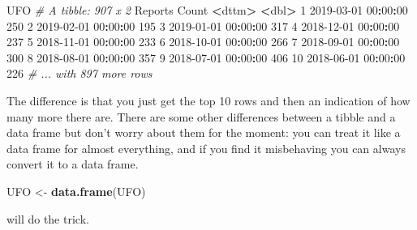 \documentclass[
]{book}
\newenvironment{Shaded}{\begin{snugshade}}{\end{snugshade}}
\newcommand{\CommentTok}[1]{\textcolor[rgb]{0.56,0.35,0.01}{\textit{#1}}}
\newcommand{\DecValTok}[1]{\textcolor[rgb]{0.00,0.00,0.81}{#1}}
\newcommand{\ErrorTok}[1]{\textcolor[rgb]{0.64,0.00,0.00}{\textbf{#1}}}
\newcommand{\KeywordTok}[1]{\textcolor[rgb]{0.13,0.29,0.53}{\textbf{#1}}}
\newcommand{\NormalTok}[1]{#1}
\newcommand{\OperatorTok}[1]{\textcolor[rgb]{0.81,0.36,0.00}{\textbf{#1}}}
\newcommand{\StringTok}[1]{\textcolor[rgb]{0.31,0.60,0.02}{#1}}
\begin{document}
\begin{Shaded}
\begin{Highlighting}[]
\NormalTok{UFO}
\CommentTok{# A tibble: 907 x 2}
\NormalTok{   Reports             Count}
   \OperatorTok{<}\NormalTok{dttm}\OperatorTok{>}\StringTok{              }\ErrorTok{<}\NormalTok{dbl}\OperatorTok{>}
\StringTok{ }\DecValTok{1} \DecValTok{2019-03-01} \DecValTok{00}\OperatorTok{:}\DecValTok{00}\OperatorTok{:}\DecValTok{00}   \DecValTok{250}
 \DecValTok{2} \DecValTok{2019-02-01} \DecValTok{00}\OperatorTok{:}\DecValTok{00}\OperatorTok{:}\DecValTok{00}   \DecValTok{195}
 \DecValTok{3} \DecValTok{2019-01-01} \DecValTok{00}\OperatorTok{:}\DecValTok{00}\OperatorTok{:}\DecValTok{00}   \DecValTok{317}
 \DecValTok{4} \DecValTok{2018-12-01} \DecValTok{00}\OperatorTok{:}\DecValTok{00}\OperatorTok{:}\DecValTok{00}   \DecValTok{237}
 \DecValTok{5} \DecValTok{2018-11-01} \DecValTok{00}\OperatorTok{:}\DecValTok{00}\OperatorTok{:}\DecValTok{00}   \DecValTok{233}
 \DecValTok{6} \DecValTok{2018-10-01} \DecValTok{00}\OperatorTok{:}\DecValTok{00}\OperatorTok{:}\DecValTok{00}   \DecValTok{266}
 \DecValTok{7} \DecValTok{2018-09-01} \DecValTok{00}\OperatorTok{:}\DecValTok{00}\OperatorTok{:}\DecValTok{00}   \DecValTok{300}
 \DecValTok{8} \DecValTok{2018-08-01} \DecValTok{00}\OperatorTok{:}\DecValTok{00}\OperatorTok{:}\DecValTok{00}   \DecValTok{357}
 \DecValTok{9} \DecValTok{2018-07-01} \DecValTok{00}\OperatorTok{:}\DecValTok{00}\OperatorTok{:}\DecValTok{00}   \DecValTok{406}
\DecValTok{10} \DecValTok{2018-06-01} \DecValTok{00}\OperatorTok{:}\DecValTok{00}\OperatorTok{:}\DecValTok{00}   \DecValTok{226}
\CommentTok{# ... with 897 more rows}
\end{Highlighting}
\end{Shaded}

The difference is that you just get the top 10 rows and then an indication of how many more there are. There are some other differences between a tibble and a data frame but don't worry about them for the moment: you can treat it like a data frame for almost everything, and if you find it misbehaving you can always convert it to a data frame.

\begin{Shaded}
\begin{Highlighting}[]
\NormalTok{UFO <-}\StringTok{ }\KeywordTok{data.frame}\NormalTok{(UFO)}
\end{Highlighting}
\end{Shaded}

will do the trick.
\end{document}
